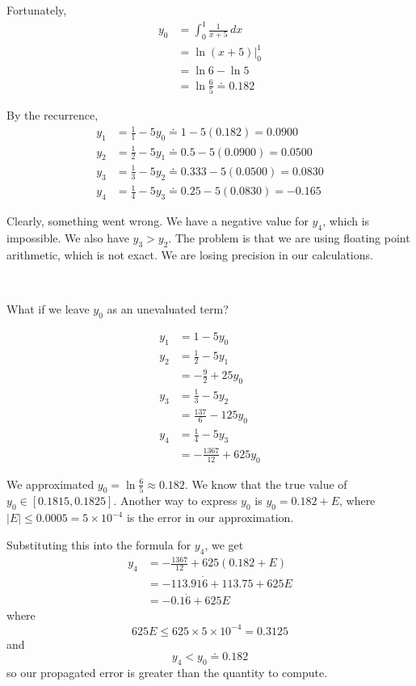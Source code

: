 \begin{example}
    Fortunately, \begin{align*}
        y_0
         & = \int_0^1 \frac{1}{x + 5} \,dx \\
         & = \ln (x + 5) \Big|_0^1         \\
         & = \ln 6 - \ln 5                 \\
         & = \ln \frac{6}{5}
        \doteq 0.182
    \end{align*}

    By the recurrence, \begin{align*}
        y_1 & = \frac{1}{1} - 5 y_0 \doteq 1 - 5 (0.182) = 0.0900      \\
        y_2 & = \frac{1}{2} - 5 y_1 \doteq 0.5 - 5 (0.0900) = 0.0500   \\
        y_3 & = \frac{1}{3} - 5 y_2 \doteq 0.333 - 5 (0.0500) = 0.0830 \\
        y_4 & = \frac{1}{4} - 5 y_3 \doteq 0.25 - 5 (0.0830) = -0.165
    \end{align*}

    Clearly, something went wrong. We have a negative value for \( y_4 \), which is impossible. We also have \( y_3 > y_2 \). The problem is that we are using floating point arithmetic, which is not exact. We are losing precision in our calculations.

        {~~~}

    What if we leave \( y_0 \) as an unevaluated term?

    \vspace{-1em}
    \begin{align*}
        y_1 & = 1 - 5y_0                  \\
        y_2 & = \frac{1}{2} - 5y_1        \\
            & = -\frac{9}{2} + 25y_0      \\
        y_3 & = \frac{1}{3} - 5y_2        \\
            & = \frac{137}{6} - 125y_0    \\
        y_4 & = \frac{1}{4} - 5y_3        \\
            & = -\frac{1367}{12} + 625y_0
    \end{align*}

    We approximated \( y_0 = \ln \frac{6}{5} \approx 0.182 \). We know that the true value of \( y_0 \in [0.1815, 0.1825] \). Another way to express \( y_0 \) is \( y_0 = 0.182 + E \), where \( | E | \leq 0.0005 = 5 \times 10^{-4} \) is the error in our approximation.

    Substituting this into the formula for \( y_4 \), we get \begin{align*}
        y_4 & = -\frac{1367}{12} + 625(0.182 + E) \\
            & = -113.91\dot{6} + 113.75 + 625E    \\
            & = -0.1\dot{6} + 625E
    \end{align*}
    where \[
        625 E \leq 625 \times 5 \times 10^{-4} = 0.3125
    \] and \[
        y_4 < y_0 \doteq 0.182
    \] so our propagated error is greater than the quantity to compute.
\end{example}

